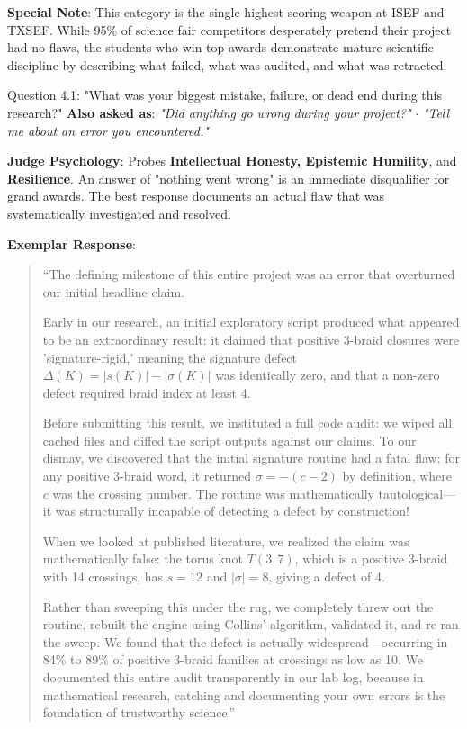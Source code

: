 \documentclass[11pt,letterpaper]{article}
\begin{document}
\textbf{Special Note}: This category is the single highest-scoring weapon at ISEF and TXSEF. While 95\% of science fair competitors desperately pretend their project had no flaws, the students who win top awards demonstrate mature scientific discipline by describing what failed, what was audited, and what was retracted.

\begin{questionbox}{Question 4.1: "What was your biggest mistake, failure, or dead end during this research?"}
\textbf{Also asked as}: \textit{"Did anything go wrong during your project?"} $\cdot$ \textit{"Tell me about an error you encountered."}
\end{questionbox}

\begin{strategybox}
\textbf{Judge Psychology}: Probes \textbf{Intellectual Honesty, Epistemic Humility}, and \textbf{Resilience}. An answer of "nothing went wrong" is an immediate disqualifier for grand awards. The best response documents an actual flaw that was systematically investigated and resolved.
\end{strategybox}

\begin{exemplarbox}
\textbf{Exemplar Response}:
\begin{quote}
``The defining milestone of this entire project was an error that overturned our initial headline claim.

Early in our research, an initial exploratory script produced what appeared to be an extraordinary result: it claimed that positive 3-braid closures were 'signature-rigid,' meaning the signature defect $\Delta(K) = |s(K)| - |\sigma(K)|$ was identically zero, and that a non-zero defect required braid index at least 4.

Before submitting this result, we instituted a full code audit: we wiped all cached files and diffed the script outputs against our claims. To our dismay, we discovered that the initial signature routine had a fatal flaw: for any positive 3-braid word, it returned $\sigma = -(c-2)$ by definition, where $c$ was the crossing number. The routine was mathematically tautological---it was structurally incapable of detecting a defect by construction!

When we looked at published literature, we realized the claim was mathematically false: the torus knot $T(3,7)$, which is a positive 3-braid with 14 crossings, has $s=12$ and $|\sigma|=8$, giving a defect of 4. 

Rather than sweeping this under the rug, we completely threw out the routine, rebuilt the engine using Collins' algorithm, validated it, and re-ran the sweep. We found that the defect is actually widespread---occurring in 84\% to 89\% of positive 3-braid families at crossings as low as 10. We documented this entire audit transparently in our lab log, because in mathematical research, catching and documenting your own errors is the foundation of trustworthy science.''
\end{quote}
\end{exemplarbox}
\end{document}
